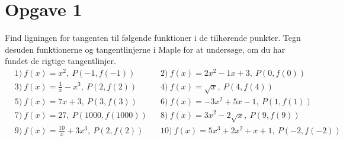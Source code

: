 \section*{Opgave 1}
Find ligningen for tangenten til følgende funktioner i de tilhørende punkter. Tegn desuden funktionerne og tangentlinjerne i Maple for at undersøge, om du har fundet de rigtige tangentlinjer. 
\begin{align*}
&1) \ f(x) = x^2,\  P(-1,f(-1))  &&2) \   f(x)=2x^2-1x+3, \ P(0,f(0))    \\
&3) \ f(x) = \frac{1}{x} -x^3, \ P(2,f(2))   &&4) \ f(x) = \sqrt{x}, \ P(4,f(4))    \\
&5) \ f(x) = 7x+3,\ P(3,f(3))   &&6) \ f(x) = -3x^2+5x-1, \ P(1,f(1))     \\
&7) \ f(x) = 27, \ P(1000,f(1000))   &&8) \ f(x) = 3x^2-2\sqrt{x}, \ P(9,f(9))     \\
&9) \ f(x) = \frac{10}{x}+3x^3, \ P(2,f(2))   &&10) \ f(x) = 5x^3+2x^2+x+1, \ P(-2,f(-2))     \\
\end{align*}
